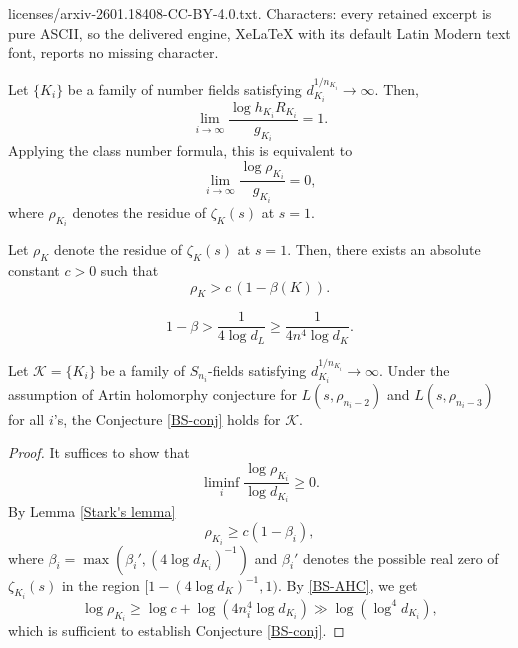 \documentclass[10pt,a4paper]{amsart}
\newcommand{\rK}{\mathcal{K}}
\begin{document}
licenses/arxiv-2601.18408-CC-BY-4.0.txt. Characters: every retained excerpt is pure ASCII, so the delivered engine, XeLaTeX with its default Latin Modern text font, reports no missing character.
\begin{conjecture}[BS]\label{BS-conj}
    Let $\{K_i\}$ be a family of number fields satisfying $d_{K_i}^{1/n_{K_i}} \to \infty$. Then,
        \begin{equation*}
            \lim_{i\to\infty} \frac{\log h_{K_i}R_{K_i}}{g_{K_i}} = 1.
        \end{equation*}
        Applying the class number formula, this is equivalent to 
        \begin{equation*}
            \lim_{i\to\infty} \frac{\log \rho_{K_i}}{ g_{K_i}} = 0,
        \end{equation*}
        where $\rho_{K_i}$ denotes the residue of $\zeta_K(s)$ at $s=1$.
\end{conjecture}

\begin{lemma}\label{Stark's lemma}
    Let $\rho_K$ denote the residue of $\zeta_K(s)$ at $s=1$.  Then, there exists an absolute constant $c>0$ such that
    \begin{equation*}
        \rho_K > c\, (1-\beta(K)).
    \end{equation*}
\end{lemma}

    \begin{equation}\label{BS-AHC}
        1-\beta > \frac{1}{4\log d_L} \geq \frac{1}{4 n^4 \log d_K}.
    \end{equation}

\begin{proposition}
    Let $\rK=\{K_i\}$ be a family of $S_{n_i}$-fields satisfying $d_{K_i}^{1/n_{K_i}} \to \infty$. Under the assumption of Artin holomorphy conjecture for $L(s,\rho_{n_i-2})$ and $L(s,\rho_{n_i-3})$ for all $i$'s, the Conjecture \ref{BS-conj} holds for $\rK$.
\end{proposition}

\begin{proof}
     It suffices to show that 
    \begin{equation*}
        \liminf_i \frac{\log \rho_{K_i}}{\log d_{K_i}} \geq 0.
    \end{equation*}
    By Lemma \ref{Stark's lemma}
    \begin{equation*}
        \rho_{K_i} \geq c (1-\beta_i),
    \end{equation*}
    where $\beta_i = \max(\beta_i', (4\log d_{K_i})^{-1}) $ and $\beta_i'$ denotes the possible real zero of $\zeta_{K_i}(s)$ in the region $[1-(4\log d_K)^{-1},1)$. By \eqref{BS-AHC}, we get
    \begin{equation*}
        \log \rho_{K_i} \geq \log c + \log (4n_i^4 \log d_{K_i}) \gg \log (\log^4 d_{K_i}),
    \end{equation*}
    which is sufficient to establish Conjecture \ref{BS-conj}.
\end{proof}
\end{document}
